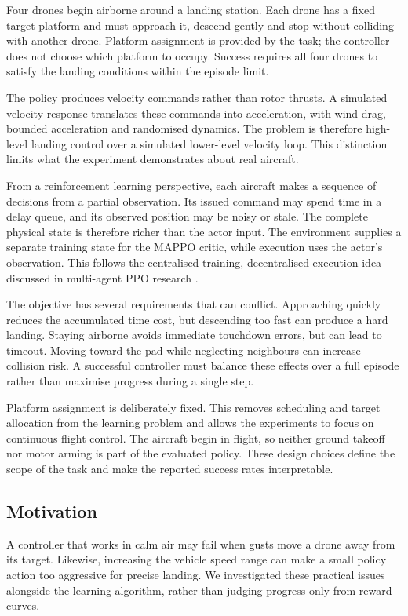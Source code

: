 Four drones begin airborne around a landing station. Each drone has a fixed target platform and must approach it, descend gently and stop without colliding with another drone. Platform assignment is provided by the task; the controller does not choose which platform to occupy. Success requires all four drones to satisfy the landing conditions within the episode limit.

The policy produces velocity commands rather than rotor thrusts. A simulated velocity response translates these commands into acceleration, with wind drag, bounded acceleration and randomised dynamics. The problem is therefore high-level landing control over a simulated lower-level velocity loop. This distinction limits what the experiment demonstrates about real aircraft.

From a reinforcement learning perspective, each aircraft makes a sequence of decisions from a partial observation. Its issued command may spend time in a delay queue, and its observed position may be noisy or stale. The complete physical state is therefore richer than the actor input. The environment supplies a separate training state for the MAPPO critic, while execution uses the actor's observation. This follows the centralised-training, decentralised-execution idea discussed in multi-agent PPO research \cite{mappo2022}.

The objective has several requirements that can conflict. Approaching quickly reduces the accumulated time cost, but descending too fast can produce a hard landing. Staying airborne avoids immediate touchdown errors, but can lead to timeout. Moving toward the pad while neglecting neighbours can increase collision risk. A successful controller must balance these effects over a full episode rather than maximise progress during a single step.

Platform assignment is deliberately fixed. This removes scheduling and target allocation from the learning problem and allows the experiments to focus on continuous flight control. The aircraft begin in flight, so neither ground takeoff nor motor arming is part of the evaluated policy. These design choices define the scope of the task and make the reported success rates interpretable.

\hypertarget{motivation}{%
\subsection{Motivation}\label{motivation}}

A controller that works in calm air may fail when gusts move a drone away from its target. Likewise, increasing the vehicle speed range can make a small policy action too aggressive for precise landing. We investigated these practical issues alongside the learning algorithm, rather than judging progress only from reward curves.

